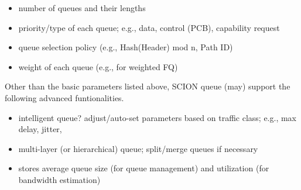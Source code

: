 \begin{itemize}
\item number of queues and their lengths
\item priority/type of each queue; e.g., data, control (PCB), capability request
\item queue selection policy (e.g., Hash(Header) mod n, Path ID)
\item weight of each queue (e.g., for weighted FQ)
\end{itemize}

Other than the basic parameters listed above, SCION queue (may) support the following advanced funtionalities.

\begin{itemize}
\item intelligent queue? adjust/auto-set parameters based on traffic class; e.g., max delay, jitter, 
\item multi-layer (or hierarchical) queue; split/merge queues if necessary
\item stores average queue size (for queue management) and utilization (for bandwidth estimation)
\end{itemize}


